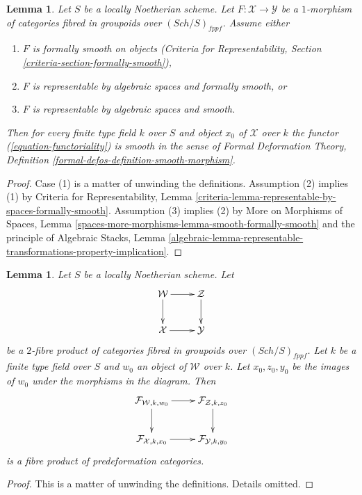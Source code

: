 \documentclass{stacks-project}
\theoremstyle{plain}
\newtheorem{lemma}[subsection]{Lemma}
\theoremstyle{definition}
\theoremstyle{remark}
\numberwithin{equation}{subsection}
\def\Sch{\mathit{Sch}}
\begin{document}
\begin{lemma}
\label{lemma-formally-smooth-on-deformation-categories}
Let $S$ be a locally Noetherian scheme. Let $F : \mathcal{X} \to \mathcal{Y}$
be a $1$-morphism of categories fibred in groupoids over $(\Sch/S)_{fppf}$.
Assume either
\begin{enumerate}
\item $F$ is formally smooth on objects (Criteria for Representability,
Section \ref{criteria-section-formally-smooth}),
\item $F$ is representable by algebraic spaces and formally smooth, or
\item $F$ is representable by algebraic spaces and smooth.
\end{enumerate}
Then for every finite type field $k$ over $S$ and object
$x_0$ of $\mathcal{X}$ over $k$ the functor (\ref{equation-functoriality})
is smooth in the sense of
Formal Deformation Theory, Definition
\ref{formal-defos-definition-smooth-morphism}.
\end{lemma}

\begin{proof}
Case (1) is a matter of unwinding the definitions.
Assumption (2) implies (1) by
Criteria for Representability, Lemma
\ref{criteria-lemma-representable-by-spaces-formally-smooth}.
Assumption (3) implies (2) by
More on Morphisms of Spaces, Lemma
\ref{spaces-more-morphisms-lemma-smooth-formally-smooth}
and the principle of
Algebraic Stacks, Lemma
\ref{algebraic-lemma-representable-transformations-property-implication}.
\end{proof}

\begin{lemma}
\label{lemma-fibre-product-deformation-categories}
Let $S$ be a locally Noetherian scheme. Let
$$
\xymatrix{
\mathcal{W} \ar[d] \ar[r] & \mathcal{Z} \ar[d] \\
\mathcal{X} \ar[r] & \mathcal{Y}
}
$$
be a $2$-fibre product of categories fibred in groupoids over
$(\Sch/S)_{fppf}$. Let $k$ be a finite type field over $S$ and
$w_0$ an object of $\mathcal{W}$ over $k$. Let $x_0, z_0, y_0$ be
the images of $w_0$ under the morphisms in the diagram. Then
$$
\xymatrix{
\mathcal{F}_{\mathcal{W}, k, w_0} \ar[d] \ar[r] &
\mathcal{F}_{\mathcal{Z}, k, z_0} \ar[d] \\
\mathcal{F}_{\mathcal{X}, k, x_0} \ar[r] & \mathcal{F}_{\mathcal{Y}, k, y_0}
}
$$
is a fibre product of predeformation categories.
\end{lemma}

\begin{proof}
This is a matter of unwinding the definitions. Details omitted.
\end{proof}
\end{document}
